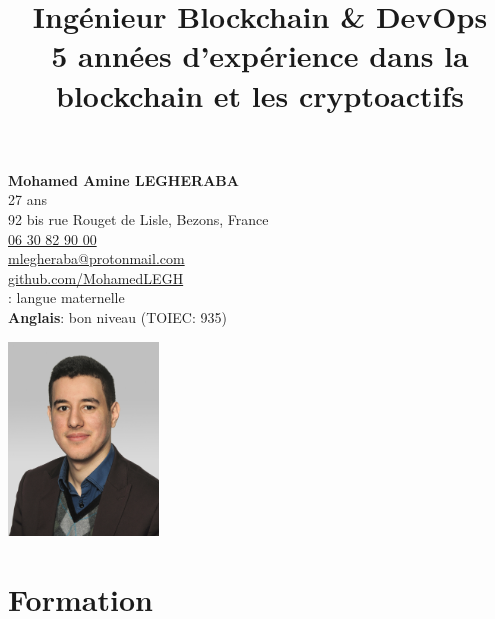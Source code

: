 \documentclass[10pt]{article}
\title{\bfseries{\huge{Ingénieur Blockchain \& DevOps}}\\[0.75cm] \Large{5 années d'expérience dans la blockchain et les cryptoactifs} }
\author{\bfseries\Huge \vspace{-4ex}}
\date{}
\begin{document}
\begin{minipage}[t]{0.80\textwidth}
\textbf{\Large{Mohamed Amine LEGHERABA}}\\
\vspace{4ex}27 ans\\
92 bis rue Rouget de Lisle, Bezons, France\\
\href{tel:0630829000}{06 30 82 90 00}\\
\href{mailto:mlegheraba@protonmail.com}{mlegheraba@protonmail.com}\\
\href{https://github.com/MohamedLEGH}{github.com/MohamedLEGH}\\
\vspace{5ex}{\bf Français}: langue maternelle \\
{\bf Anglais}: bon niveau (TOIEC: 935) \\
\end{minipage}
\begin{minipage}[t]{0.20\textwidth}
\vspace{-3ex}
\includegraphics[width=4cm]{figures/Legheraba-Mohamed.jpg}
\end{minipage}
{\let\newpage\relax\maketitle}
\thispagestyle{empty}

\vspace{-10ex}

\section*{Formation}

\vspace{2ex}
\end{document}
